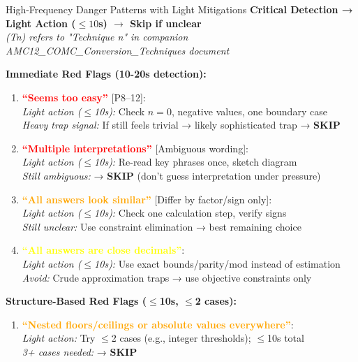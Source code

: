 \documentclass{article}
\begin{document}
\begin{classifybox}{High-Frequency Danger Patterns with Light Mitigations}
\textbf{Critical Detection → Light Action ($\leq10$s) $\rightarrow$ Skip if unclear}\\
{\footnotesize\textit{(Tn) refers to "Technique n" in companion AMC12\_COMC\_Conversion\_Techniques document}}

\textbf{Immediate Red Flags (10-20s detection):}
\begin{enumerate}[nosep]
\item \textcolor{red}{\textbf{``Seems too easy''}} [P8--12]:\\
  \textit{Light action ($\leq$10s):} Check $n=0$, negative values, one boundary case\\
  \textit{Heavy trap signal:} If still feels trivial → likely sophisticated trap → \textbf{SKIP}

\item \textcolor{red}{\textbf{``Multiple interpretations''}} [Ambiguous wording]:\\
  \textit{Light action ($\leq$10s):} Re-read key phrases once, sketch diagram\\
  \textit{Still ambiguous:} → \textbf{SKIP} (don't guess interpretation under pressure)

\item \textcolor{orange}{\textbf{``All answers look similar''}} [Differ by factor/sign only]:\\
  \textit{Light action ($\leq$10s):} Check one calculation step, verify signs\\
  \textit{Still unclear:} Use constraint elimination → best remaining choice

\item \textcolor{yellow}{\textbf{``All answers are close decimals''}}:\\
  \textit{Light action ($\leq$10s):} Use exact bounds/parity/mod instead of estimation\\
  \textit{Avoid:} Crude approximation traps → use objective constraints only
\end{enumerate}

\textbf{Structure-Based Red Flags ($\leq$10s, $\leq$2 cases):}
\begin{enumerate}[nosep,start=5]
\item \textcolor{orange}{\textbf{``Nested floors/ceilings or absolute values everywhere''}}:\\
  \textit{Light action:} Try $\leq$2 cases (e.g., integer thresholds); $\leq$10s total\\
  \textit{3+ cases needed:} → \textbf{SKIP}


\end{enumerate}
\end{classifybox}
\end{document}

